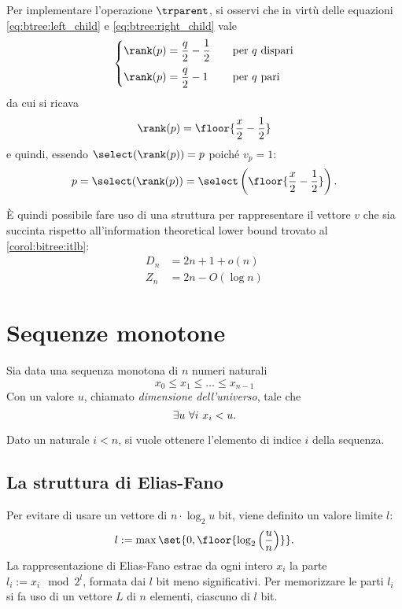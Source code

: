 Per implementare l'operazione $\trparent$, si osservi che in virtù delle equazioni \ref{eq:btree:left_child} e \ref{eq:btree:right_child} vale
\begin{equation*}
	\begin{cases}
		\rank(p)=\dfrac{q}{2}-\dfrac12 & \quad\text{per $q$ dispari} \\[2ex]
		\rank(p)=\dfrac{q}{2}-1        & \quad\text{per $q$ pari}
	\end{cases}
\end{equation*}
da cui si ricava
\begin{equation*}
	\rank(p)=\floor{\frac x2-\frac 12}
\end{equation*}
e quindi, essendo $\select(\rank(p))=p$ poiché $v_p=1$:
\begin{equation*}
	p=\select(\rank(p))=\select\left(\floor{\frac x2-\frac 12}\right) \text.
\end{equation*}

È quindi possibile fare uso di una struttura per rappresentare il vettore $v$ che sia succinta rispetto all'information theoretical lower bound trovato al \cref{corol:bitree:itlb}:
\begin{align*}
	D_n & = 2n+1+o(n)    \\
	Z_n & = 2n-O(\log n)
\end{align*}



\section{Sequenze monotone}
Sia data una sequenza monotona di $n$ numeri naturali
\begin{equation*}
	x_0\leq x_1\leq \dots \leq x_{n-1}
\end{equation*}
Con un valore $u$, chiamato \emph{dimensione dell'universo}, tale che
\begin{equation*}
	\exists u ~ \forall i ~ x_i < u \text.
\end{equation*}

Dato un naturale $i<n$, si vuole ottenere l'elemento di indice $i$ della sequenza.


\subsection{La struttura di Elias-Fano}
Per evitare di usare un vettore di $n\cdot\log_2 u$ bit, viene definito un valore limite $l$:
\begin{equation*}
	l := \max\set{0,\floor{\log_2\left(\frac{u}{n}\right)}}\text.
\end{equation*}
La rappresentazione di Elias-Fano estrae da ogni intero $x_i$ la parte $l_i:=x_i\mod 2^l$, formata dai $l$ bit meno significativi. Per memorizzare le parti $l_i$ si fa uso di un vettore $L$ di $n$ elementi, ciascuno di $l$ bit.

